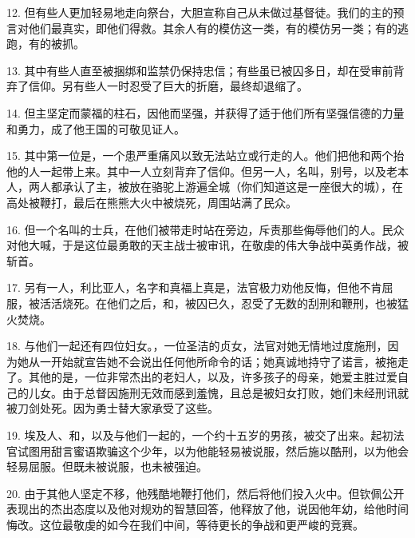 12. 但有些人更加轻易地走向祭台，大胆宣称自己从未做过基督徒。我们的主的预言对他们最真实，即他们得救。其余人有的模仿这一类，有的模仿另一类；有的逃跑，有的被抓。\par

13. 其中有些人直至被捆绑和监禁仍保持忠信；有些虽已被囚多日，却在受审前背弃了信仰。另有些人一时忍受了巨大的折磨，最终却退缩了。\par

14. 但主坚定而蒙福的柱石，因他而坚强，并获得了适于他们所有坚强信德的力量和勇力，成了他王国的可敬见证人。\par

15. 其中第一位是，一个患严重痛风以致无法站立或行走的人。他们把他和两个抬他的人一起带上来。其中一人立刻背弃了信仰。但另一人，名叫，别号，以及老本人，两人都承认了主，被放在骆驼上游遍全城（你们知道这是一座很大的城），在高处被鞭打，最后在熊熊大火中被烧死，周围站满了民众。\par

16. 但一个名叫的士兵，在他们被带走时站在旁边，斥责那些侮辱他们的人。民众对他大喊，于是这位最勇敢的天主战士被审讯，在敬虔的伟大争战中英勇作战，被斩首。\par

17. 另有一人，利比亚人，名字和真福上真是，法官极力劝他反悔，但他不肯屈服，被活活烧死。在他们之后，和，被囚已久，忍受了无数的刮刑和鞭刑，也被猛火焚烧。\par

18. 与他们一起还有四位妇女。，一位圣洁的贞女，法官对她无情地过度施刑，因为她从一开始就宣告她不会说出任何他所命令的话；她真诚地持守了诺言，被拖走了。其他的是，一位非常杰出的老妇人，以及，许多孩子的母亲，她爱主胜过爱自己的儿女。由于总督因施刑无效而感到羞愧，且总是被妇女打败，她们未经刑讯就被刀剑处死。因为勇士替大家承受了这些。\par

19. 埃及人、和，以及与他们一起的，一个约十五岁的男孩，被交了出来。起初法官试图用甜言蜜语欺骗这个少年，以为他能轻易被说服，然后施以酷刑，以为他会轻易屈服。但既未被说服，也未被强迫。\par

20. 由于其他人坚定不移，他残酷地鞭打他们，然后将他们投入火中。但钦佩公开表现出的杰出态度以及他对规劝的智慧回答，他释放了他，说因他年幼，给他时间悔改。这位最敬虔的如今在我们中间，等待更长的争战和更严峻的竞赛。\par

